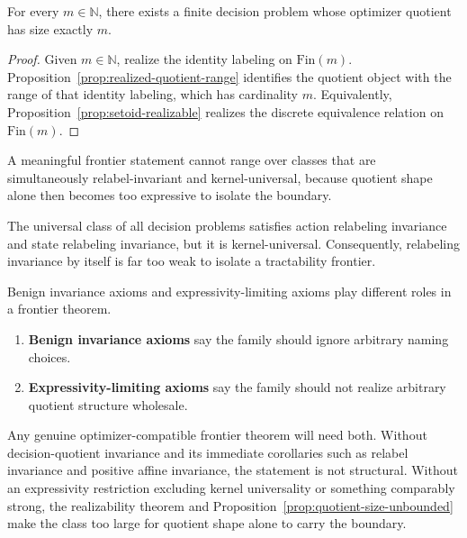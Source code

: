 \begin{proposition}\label{prop:quotient-size-unbounded}
For every $m \in \mathbb{N}$, there exists a finite decision problem whose optimizer quotient has size exactly $m$.
\end{proposition}

\begin{proof}
Given $m \in \mathbb{N}$, realize the identity labeling on $\mathrm{Fin}(m)$. Proposition~\ref{prop:realized-quotient-range} identifies the quotient object with the range of that identity labeling, which has cardinality $m$. Equivalently, Proposition~\ref{prop:setoid-realizable} realizes the discrete equivalence relation on $\mathrm{Fin}(m)$.
\end{proof}

A meaningful frontier statement cannot range over classes that are simultaneously relabel-invariant and kernel-universal, because quotient shape alone then becomes too expressive to isolate the boundary.

\begin{proposition}\label{prop:invariance-too-weak}
The universal class of all decision problems satisfies action relabeling invariance and state relabeling invariance, but it is kernel-universal. Consequently, relabeling invariance by itself is far too weak to isolate a tractability frontier.
\end{proposition}

Benign invariance axioms and expressivity-limiting axioms play different roles in a frontier theorem.

\begin{enumerate}
\item \textbf{Benign invariance axioms} say the family should ignore arbitrary naming choices.
\item \textbf{Expressivity-limiting axioms} say the family should not realize arbitrary quotient structure wholesale.
\end{enumerate}

Any genuine optimizer-compatible frontier theorem will need both. Without decision-quotient invariance and its immediate corollaries such as relabel invariance and positive affine invariance, the statement is not structural. Without an expressivity restriction excluding kernel universality or something comparably strong, the realizability theorem and Proposition~\ref{prop:quotient-size-unbounded} make the class too large for quotient shape alone to carry the boundary.


